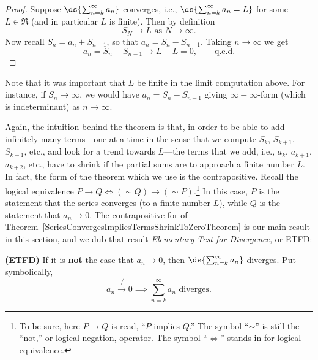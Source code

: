 \begin{proof}
Suppose $\ds{\sum_{n=k}^\infty a_n}$ converges, i.e.,
$\ds{\sum_{n=k}^\infty a_n=L}$ for some $L\in\Re$
(and in particular $L$ is finite).
Then by definition
$$S_N\longrightarrow L\text{ as }N\to\infty.$$
Now recall $S_{n}=a_n+S_{n-1}$, so that $a_n=S_n-S_{n-1}$.
Taking $n\to\infty$ we get
$$a_n=S_n-S_{n-1}\longrightarrow L-L=0,\qquad\text{q.e.d.}$$
\end{proof}
Note that it was important that $L$ be finite in the limit
computation above.  For instance, if $S_n\to\infty$, we
would have $a_n=S_n-S_{n-1}$ giving $\infty-\infty$-form 
(which is indeterminant) as
$n\to\infty$.

Again, the intuition behind the theorem is that, in order to
be able to add infinitely many terms---one at a time in the
sense that we compute $S_k$, $S_{k+1}$, $S_{k+1}$, etc., 
and look for a trend towards $L$---the terms that we add,
i.e., $a_k$, $a_{k+1}$, $a_{k+2}$, etc., have to shrink
if the partial sums are to approach a finite number $L$.
In fact, the form of the theorem which we use is the
contrapositive.  Recall
the logical equivalence $P\longrightarrow Q
\iff(\sim Q)\longrightarrow(\sim P)$.\footnote{%
To be sure, here $P\longrightarrow Q$ is read, 
``$P$ implies $Q$.''  The symbol ``$\sim$'' is still
the ``not,'' or logical negation, operator.
The symbol ``$\iff$'' stands in for logical equivalence.
}
In this case, $P$ is the statement that the series converges (to 
a finite number $L$), while $Q$ is the statement that $a_n\to0$.
The contrapositive for of 
Theorem~\ref{SeriesConvergesImpliesTermsShrinkToZeroTheorem}
is our main result in this section, and we dub that result
{\it Elementary Test for Divergence}, or ETFD:
\begin{theorem} {\bf (ETFD)}
If it is {\bf not} the case that $a_n\to0$, then $\ds{\sum_{n=k}^\infty a_n}$
diverges.
Put symbolically,
\begin{equation}
a_n\not{\!\!\to0}\implies\sum_{n=k}^\infty a_n\text{ diverges.}
\label{ETFDequation}
\end{equation}
\label{ETFD}\end{theorem}

